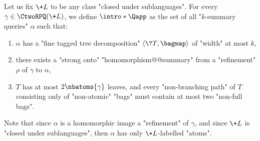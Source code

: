 Let us fix $\+L$ to be any class  "closed under sublanguages". For every $\gamma \in \CtwoRPQ(\+L)$, we define \AP $\intro*\Qapp$ as the set of all "$k$-summary queries" $\alpha$ such that:
\begin{enumerate}[label=\roman*.]
	\item $\alpha$ has a "fine tagged tree decomposition" $\tup{\?T, \bagmap}$ of "width" at most $k$,
	\item there exists a "strong onto" "homomorphism@@summary" from a "refinement" $\rho$ of $\gamma$ to $\alpha$, 
	\item $T$ has at most $2\nbatoms{\gamma}$ leaves, and every
		"non-branching path" of $T$ consisting only of "non-atomic" "bags" must contain at most two "non-full bags".
\end{enumerate}
Note that since $\alpha$ is a homomorphic image a "refinement" of $\gamma$,
and since $\+L$ is "closed under sublanguages", then $\alpha$ has only $\+L$-labelled "atoms".

